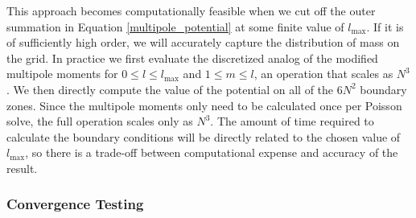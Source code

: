 \documentclass{emulateapj}
\begin{document}

This approach becomes computationally feasible when we cut off the
outer summation in Equation \ref{multipole_potential} at some finite
value of $l_{\text{max}}$. If it is of sufficiently high order, we
will accurately capture the distribution of mass on the grid. In
practice we first evaluate the discretized analog of the modified
multipole moments for $0 \leq l \leq l_{\text{max}}$ and $1 \leq m
\leq l$, an operation that scales as $N^3$. We then directly compute
the value of the potential on all of the $6N^2$ boundary zones. Since
the multipole moments only need to be calculated once per Poisson
solve, the full operation scales only as $N^3$. The amount of time
required to calculate the boundary conditions will be directly related
to the chosen value of $l_{\text{max}}$, so there is a trade-off
between computational expense and accuracy of the result.


\subsubsection{Convergence Testing}\label{sec:gravity_convergence_testing}
\end{document}
